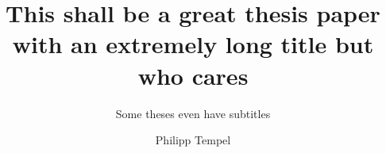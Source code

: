 \title{This shall be a great thesis paper with an extremely long title but who cares}
\subtitle{Some theses even have subtitles}
\author{Philipp Tempel}

\usepackage{lipsum}
